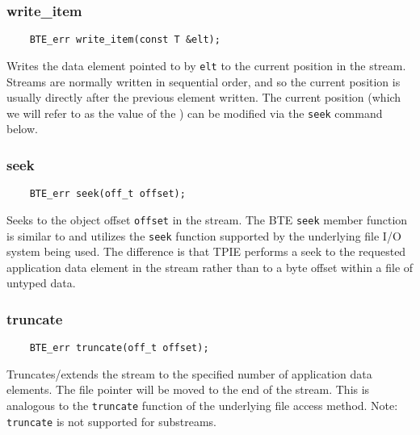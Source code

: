 \subsubsection{write\_item}
\begin{lstlisting}
    BTE_err write_item(const T &elt);
\end{lstlisting}
Writes the data element pointed to by \lstinline|elt| to the
current position in the stream. Streams are normally written
in sequential order, and so the current position is usually
directly after the previous element written. The current
position (which we will refer to as the value of the
) can be modified via the \lstinline|seek|
command below.  


\subsubsection{seek}
\begin{lstlisting}
    BTE_err seek(off_t offset);
\end{lstlisting}
Seeks to the object offset \lstinline|offset| in the
stream. The BTE \lstinline|seek| member function is similar to
and utilizes the \lstinline|seek| function supported by the
underlying file I/O system being used. The difference is
that TPIE performs a seek to the requested application data
element in the stream rather than to a byte offset within a
file of untyped data. 


\subsubsection{truncate}
\begin{lstlisting}
    BTE_err truncate(off_t offset);
\end{lstlisting}
Truncates/extends the stream to the specified number of
application data elements. The file
pointer will be moved to
the end of the stream. This is analogous to the
\lstinline|truncate| function of the underlying file access
method. Note: \lstinline|truncate| is not supported for substreams.

